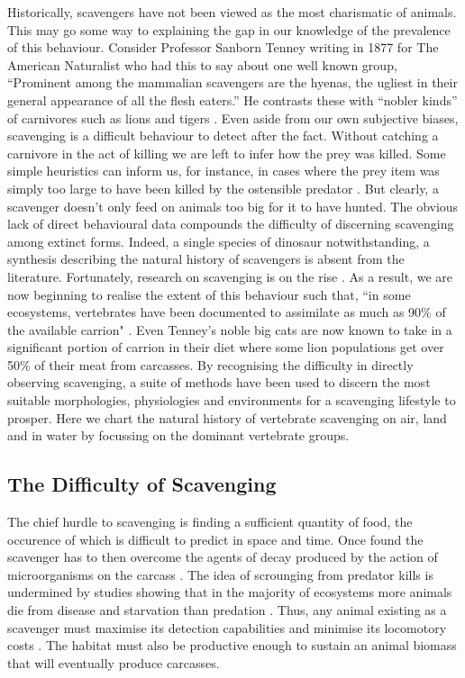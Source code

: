 \documentclass[a4paper,12pt]{article}
\begin{document}
Historically, scavengers have not been viewed as the most charismatic of animals. This may go some way to explaining the gap in our knowledge of the prevalence of this behaviour. Consider Professor Sanborn Tenney writing in 1877 for The American Naturalist who had this to say about one well known group, “Prominent among the mammalian scavengers are the hyenas, the ugliest in their general appearance of all the flesh eaters.” He contrasts these with “nobler kinds” of carnivores such as lions and tigers \citep{tenney1877few}. Even aside from our own subjective biases, scavenging is a difficult behaviour to detect after the fact. Without catching a carnivore in the act of killing we are left to infer how the prey was killed. Some simple heuristics can inform us, for instance, in cases where the prey item was simply too large to have been killed by the ostensible predator \citep{pobiner2008paleoecological}. But clearly, a scavenger doesn’t only feed on animals too big for it to have hunted. The obvious lack of direct behavioural data compounds the difficulty of discerning scavenging among extinct forms. Indeed, a single species of dinosaur notwithstanding, a synthesis describing the natural history of scavengers is absent from the literature. Fortunately, research on scavenging is on the rise \citep{manga2006vulture}. As a result, we are now beginning to realise the extent of this behaviour such that, “in some ecosystems, vertebrates have been documented to assimilate as much as 90\% of the available carrion" \citep{benbow2015introduction}. Even Tenney’s noble big cats are now known to take in a significant portion of carrion in their diet where some lion populations get over 50\% of their meat from carcasses. By recognising the difficulty in directly observing scavenging, a suite of methods have been used to discern the most suitable morphologies, physiologies and environments for a scavenging lifestyle to prosper. Here we chart the natural history of vertebrate scavenging on air, land and in water by focussing on the dominant vertebrate groups. %
\subsection*{The Difficulty of Scavenging}
The chief hurdle to scavenging is finding a sufficient quantity of food, the occurence of which is difficult to predict in space and time. Once found the scavenger has to then overcome the agents of decay produced by the action of microorganisms on the carcass \citep{ruxton2014fruit}. The idea of scrounging from predator kills is undermined by studies showing that in the  majority of ecosystems more animals die from disease and starvation than predation \citep{benbow2015introduction}. Thus, any animal existing as a scavenger must maximise its detection capabilities and minimise its locomotory costs \citep{ruxton2004obligate}. The habitat must also be productive enough to sustain an animal biomass that will eventually produce carcasses. 
\end{document}

